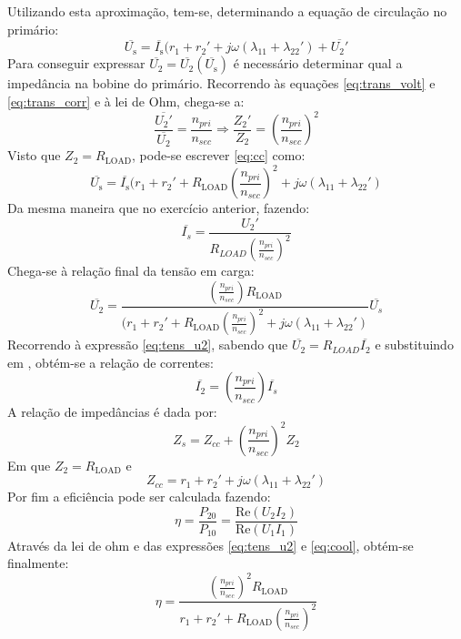 \documentclass[%
  reprint,
  nofootinbib,
  amsmath,amssymb,
  aps,
  10pt,
]{revtex4-1}
\begin{document}
Utilizando esta aproximação, tem-se, determinando a equação de circulação no primário:
\begin{equation}
\overline{U_{\mathrm{s}}}=\overline{I_{\mathrm{s}}}(r_1+r_2'+j\omega(\lambda_{11}+\lambda_{22}')+\overline{U_2'}
\label{eq:cc}
\end{equation}
Para conseguir expressar $\overline{U_2}=\overline{U_2}(\overline{U_{\mathrm{s}}})$ é necessário determinar qual a impedância na bobine do primário. Recorrendo às equações \ref{eq:trans_volt} e \ref{eq:trans_corr} e à lei de Ohm, chega-se a:
\begin{equation}
\frac{\overline{U_{2}'}}{\overline{U_{2}}}=\frac{n_{pri}}{n_{sec}}\Rightarrow \frac{Z_2'}{Z_2}=\left (\frac{n_{pri}}{n_{sec}}\right)^2
\end{equation}
Visto que $Z_2=R_{\mathrm{LOAD}}$, pode-se escrever \ref{eq:cc} como:
\begin{equation}
\overline{U_{\mathrm{s}}}=\overline{I_{\mathrm{s}}}(r_1+r_2'+R_{\mathrm{LOAD}}\left(\frac{n_{pri}}{n_{sec}}\right)^2+j\omega(\lambda_{11}+\lambda_{22}')
\label{eq:tens_u2}
\end{equation}
Da mesma maneira que no exercício anterior, fazendo:
\begin{equation}
\overline{I_s}=\frac{U_2'}{R_{LOAD}\left(\frac{n_{pri}}{n_{sec}}\right)^2}
\end{equation}
Chega-se à relação final da tensão em carga:
\begin{equation}
\overline{U_2}=\frac{\left(\frac{n_{pri}}{n_{sec}}\right)R_{\mathrm{LOAD}}}{(r_1+r_2'+R_{\mathrm{LOAD}}\left(\frac{n_{pri}}{n_{sec}}\right)^2+j\omega(\lambda_{11}+\lambda_{22}')}\overline{U_s}
\label{eq:derradeira}
\end{equation}
Recorrendo à expressão \ref{eq:tens_u2}, sabendo que $\overline{U_2}=R_{LOAD}\overline{I_2}$ e substituindo em \label{eq:derradeira}, obtém-se a relação de correntes:
\begin{equation}
\overline{I_2}=\left(\frac{n_{pri}}{n_{sec}}\right)\overline{I_s}
\label{eq:cool}
\end{equation}
A relação de impedâncias é dada por:
\begin{equation}
Z_s=Z_{cc}+\left (\frac{n_{pri}}{n_{sec}}\right)^2Z_2
\end{equation}
Em que $Z_2=R_{\mathrm{LOAD}}$ e
\begin{equation}
Z_{cc}=r_1+r_2'+j\omega(\lambda_{11}+\lambda_{22}')
\end{equation}
Por fim a eficiência pode ser calculada fazendo:
\begin{equation}
\eta=\frac{P_{20}}{P_{10}}=\frac{\mathrm{Re}(U_2I_2)}{\mathrm{Re}(U_1I_1)}
\end{equation}
Através da lei de ohm e das expressões \ref{eq:tens_u2} e \ref{eq:cool}, obtém-se finalmente:
\begin{equation}
\eta=\frac{\left(\frac{n_{pri}}{n_{sec}}\right)^2R_\mathrm{LOAD}}{r_1+r_2'+R_{\mathrm{LOAD}}\left(\frac{n_{pri}}{n_{sec}}\right)^2}
\end{equation}
\end{document}
